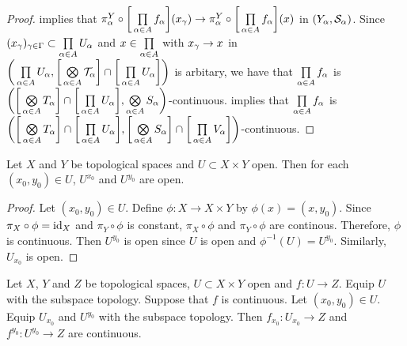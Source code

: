 \documentclass{book}
\begin{document}
\begin{proof}
		 implies that $\pi^Y_{\alpha} \circ \bigg[ \prod\limits_{\alpha \in A}f_{\alpha} \bigg] (x_{\gamma}) \rightarrow \pi^Y_{\alpha} \circ \bigg[ \prod\limits_{\alpha \in A}f_{\alpha} \bigg] (x) $ in $(Y_{\alpha}, \mathcal{S}_{\alpha})$. Since $(x_{\gamma})_{\gamma \in \Gamma} \subset \prod\limits_{\alpha \in A} U_{\alpha}$ and $x \in \prod\limits_{\alpha \in A}$ with $x_{\gamma} \rightarrow x$ in $\bigg( \prod\limits_{\alpha \in A} U_{\alpha} , \bigg[ \bigotimes\limits_{\alpha \in A} \mathcal{T}_{\alpha} \bigg] \cap \bigg[ \prod\limits_{\alpha \in A} U_{\alpha} \bigg] \bigg)$ is arbitary, we have that $\prod\limits_{\alpha \in A}f_{\alpha}$ is $\bigg( \bigg[ \bigotimes\limits_{\alpha \in A} T_{\alpha} \bigg]  \cap \bigg[ \prod\limits_{\alpha \in A} U_{\alpha} \bigg], \bigotimes\limits_{\alpha \in A} S_{\alpha} \bigg)$-continuous.  implies that $\prod\limits_{\alpha \in A}f_{\alpha}$ is $\bigg( \bigg[ \bigotimes\limits_{\alpha \in A} T_{\alpha} \bigg]  \cap \bigg[ \prod\limits_{\alpha \in A} U_{\alpha} \bigg], \bigg[ \bigotimes\limits_{\alpha \in A} S_{\alpha} \bigg] \cap \bigg[ \prod\limits_{\alpha \in A} V_{\alpha} \bigg] \bigg)$-continuous.
	\end{proof}

	\begin{defn}
	\end{defn}
	
	\begin{ex} 
		Let $X$ and $Y$ be topological spaces and $U \subset X \times Y$ open. Then for each $(x_0,  y_0) \in U$, $U^{x_0}$ and $U^{y_0}$ are open.
	\end{ex}
	
	\begin{proof}
		Let $(x_0, y_0) \in U$. Define $\phi: X \rightarrow X \times Y$ by $\phi(x) = (x, y_0)$. Since $\pi_X \circ \phi = \operatorname{id}_X$ and $\pi_Y \circ \phi$ is constant, $\pi_X \circ \phi$ and $\pi_Y \circ \phi$ are continous. Therefore, $\phi$ is continuous. Then $U^{y_0}$ is open since $U$ is open and $\phi^{-1}(U) = U^{y_0}$. Similarly, $U_{x_0}$ is open.
	\end{proof}

	\begin{ex} 
		Let $X$, $Y$ and $Z$ be topological spaces, $U \subset X \times Y$ open and $f: U \rightarrow Z$. Equip $U$ with the subspace topology. Suppose that $f$ is continuous. Let $(x_0, y_0) \in U$. Equip $U_{x_0}$ and $U^{y_0}$ with the subspace topology. Then $f_{x_0}:U_{x_0} \rightarrow Z$ and $f^{y_0}: U^{y_0} \rightarrow Z$ are continuous.
	\end{ex}
\end{document}
